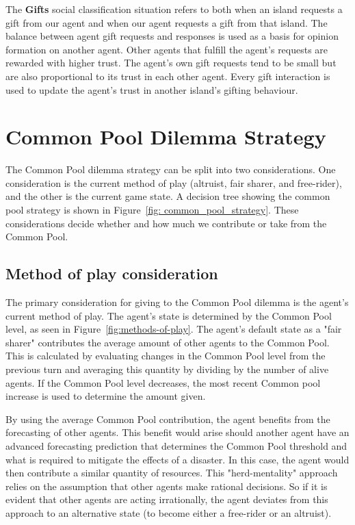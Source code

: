 The \textbf{Gifts} social classification situation refers to both when an island requests a gift from our agent and when our agent requests a gift from that island. The balance between agent gift requests and responses is used as a basis for opinion formation on another agent. Other agents that fulfill the agent's requests are rewarded with higher trust. The agent's own gift requests tend to be small but are also proportional to its trust in each other agent. Every gift interaction is used to update the agent's trust in another island's gifting behaviour.

\section{Common Pool Dilemma Strategy} \label{sec:Common Pool Dilemma Strategy}
The Common Pool dilemma strategy can be split into two considerations. One consideration is the current method of play (altruist, fair sharer, and free-rider), and the other is the current game state. A decision tree showing the common pool strategy is shown in Figure~\ref{fig: common_pool_strategy}. These considerations decide whether and how much we contribute or take from the Common Pool.

\subsection{Method of play consideration} \label{ssec:Method of play consideration}
The primary consideration for giving to the Common Pool dilemma is the agent's current method of play. The agent's state is determined by the Common Pool level, as seen in Figure~\ref{fig:methods-of-play}. The agent's default state as a "fair sharer" contributes the average amount of other agents to the Common Pool. This is calculated by evaluating changes in the Common Pool level from the previous turn and averaging this quantity by dividing by the number of alive agents. If the Common Pool level decreases, the most recent Common pool increase is used to determine the amount given.

By using the average Common Pool contribution, the agent benefits from the forecasting of other agents. This benefit would arise should another agent have an advanced forecasting prediction that determines the Common Pool threshold and what is required to mitigate the effects of a disaster. In this case, the agent would then contribute a similar quantity of resources. This "herd-mentality" approach relies on the assumption that other agents make rational decisions. So if it is evident that other agents are acting irrationally, the agent deviates from this approach to an alternative state (to become either a free-rider or an altruist).

